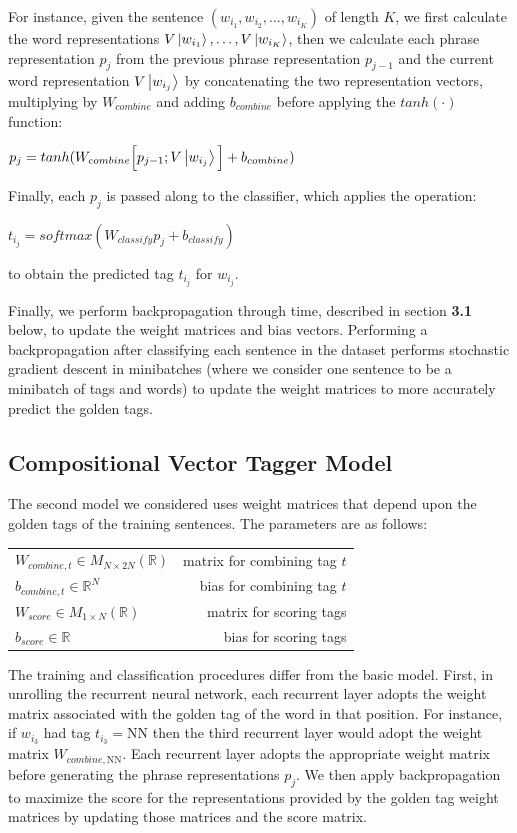 \documentclass[11pt]{article}
\begin{document}
For instance, given the sentence $(w_{i_1},w_{i_2},\ldots,w_{i_K})$ of length $K$, we first calculate the word representations $V\Ket{w_{i_1}},\ldots,V\Ket{w_{i_K}}$, then we calculate each phrase representation $p_j$ from the previous phrase representation $p_{j-1}$ and the current word representation $V\Ket{w_{i_j}}$ by concatenating the two representation vectors, multiplying by $W_{combine}$ and adding $b_{combine}$ before applying the $tanh(\cdot)$ function:

$p_j = tanh(W_{combine}\Big[p_{j-1};V\Ket{w_{i_j}}\Big] + b_{combine})$

Finally, each $p_j$ is passed along to the classifier, which applies the operation:

$t_{i_j} = softmax(W_{classify}p_j + b_{classify})$

to obtain the predicted tag $t_{i_j}$ for $w_{i_j}$.

Finally, we perform backpropagation through time, described in section \textbf{3.1} below, to update the weight matrices and bias vectors. Performing a backpropagation after classifying each sentence in the dataset performs stochastic gradient descent in minibatches (where we consider one sentence to be a minibatch of tags and words) to update the weight matrices to more accurately predict the golden tags.

\subsection{Compositional Vector Tagger Model}

The second model we considered uses weight matrices that depend upon the golden tags of the training sentences. The parameters are as follows:

\begin{center}
\begin{tabular}{ l r }
  $W_{combine,t}\in M_{N\times2N}(\mathbb{R})$ & matrix for combining tag $t$ \\
  $b_{combine,t}\in \mathbb{R}^N$ & bias for combining tag $t$ \\
  $W_{score}\in M_{1\times N}(\mathbb{R})$ & matrix for scoring tags \\
  $b_{score}\in \mathbb{R}$ & bias for scoring tags \\
\end{tabular}
\end{center}

\vspace{5mm}
The training and classification procedures differ from the basic model. First, in unrolling the recurrent neural network, each recurrent layer adopts the weight matrix associated with the golden tag of the word in that position. For instance, if $w_{i_3}$ had tag $t_{i_3} = \text{NN}$ then the third recurrent layer would adopt the weight matrix $W_{combine,\text{NN}}$. Each recurrent layer adopts the appropriate weight matrix before generating the phrase representations $p_j$. We then apply backpropagation to maximize the score for the representations provided by the golden tag weight matrices by updating those matrices and the score matrix.
\end{document}
